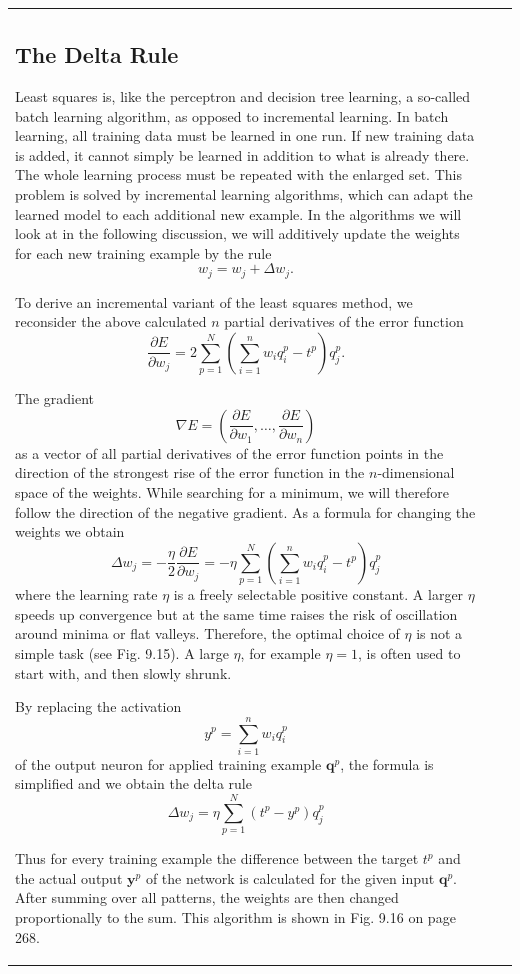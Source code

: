 \documentclass[10pt]{book}
\begin{document}
\begin{center}
\begin{tabular}{|l|l|l|}
\subsection{The Delta Rule}
Least squares is, like the perceptron and decision tree learning, a so-called batch learning algorithm, as opposed to incremental learning. In batch learning, all training data must be learned in one run. If new training data is added, it cannot simply be learned in addition to what is already there. The whole learning process must be repeated with the enlarged set. This problem is solved by incremental learning algorithms, which can adapt the learned model to each additional new example. In the algorithms we will look at in the following discussion, we will additively update the weights for each new training example by the rule
$$
w_{j}=w_{j}+\Delta w_{j} .
$$

To derive an incremental variant of the least squares method, we reconsider the above calculated $n$ partial derivatives of the error function
$$
\frac{\partial E}{\partial w_{j}}=2 \sum_{p=1}^{N}\left(\sum_{i=1}^{n} w_{i} q_{i}^{p}-t^{p}\right) q_{j}^{p} .
$$

The gradient
$$
\nabla E=\left(\frac{\partial E}{\partial w_{1}}, \ldots, \frac{\partial E}{\partial w_{n}}\right)
$$
as a vector of all partial derivatives of the error function points in the direction of the strongest rise of the error function in the $n$-dimensional space of the weights. While searching for a minimum, we will therefore follow the direction of the negative gradient. As a formula for changing the weights we obtain
$$
\Delta w_{j}=-\frac{\eta}{2} \frac{\partial E}{\partial w_{j}}=-\eta \sum_{p=1}^{N}\left(\sum_{i=1}^{n} w_{i} q_{i}^{p}-t^{p}\right) q_{j}^{p}
$$
where the learning rate $\eta$ is a freely selectable positive constant. A larger $\eta$ speeds up convergence but at the same time raises the risk of oscillation around minima or flat valleys. Therefore, the optimal choice of $\eta$ is not a simple task (see Fig. 9.15). A large $\eta$, for example $\eta=1$, is often used to start with, and then slowly shrunk.

By replacing the activation
$$
y^{p}=\sum_{i=1}^{n} w_{i} q_{i}^{p}
$$
of the output neuron for applied training example $\boldsymbol{q}^{p}$, the formula is simplified and we obtain the delta rule
$$
\Delta w_{j}=\eta \sum_{p=1}^{N}\left(t^{p}-y^{p}\right) q_{j}^{p}
$$

Thus for every training example the difference between the target $t^{p}$ and the actual output $\boldsymbol{y}^{p}$ of the network is calculated for the given input $\boldsymbol{q}^{p}$. After summing over all patterns, the weights are then changed proportionally to the sum. This algorithm is shown in Fig. 9.16 on page 268.


\end{tabular}
\end{center}
\end{document}
